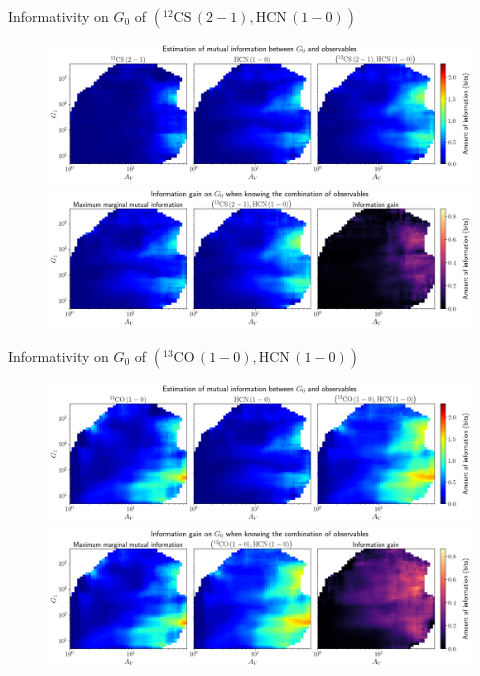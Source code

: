 \documentclass{beamer}
\begin{document}
\begin{frame}{Informativity on $G_0$ of $\left(\mathrm{^{12}CS\,(2-1)},\mathrm{HCN\,(1-0)}\right)$}
    \begin{figure}
        \centering
        \includegraphics[width=0.95\linewidth]{../mi/g0__12cs21_hcn10_mi.png}
        \vfill
        \includegraphics[width=0.95\linewidth]{../mi/g0__12cs21_hcn10_mi_gain.png}
    \end{figure}
\end{frame}

\begin{frame}{Informativity on $G_0$ of $\left(\mathrm{^{13}CO\,(1-0)},\mathrm{HCN\,(1-0)}\right)$}
    \begin{figure}
        \centering
        \includegraphics[width=0.95\linewidth]{../mi/g0__13co10_hcn10_mi.png}
        \vfill
        \includegraphics[width=0.95\linewidth]{../mi/g0__13co10_hcn10_mi_gain.png}
    \end{figure}
\end{frame}
\end{document}
